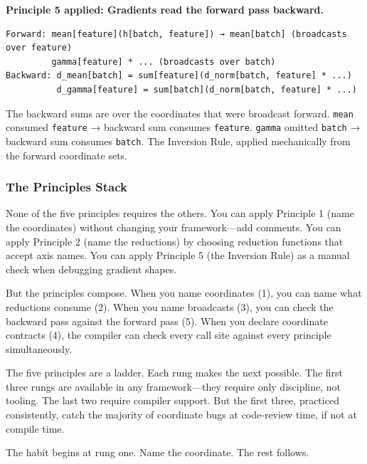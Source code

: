 \documentclass[11pt,titlepage]{article}
\begin{document}
\textbf{Principle 5 applied: Gradients read the forward pass backward.}

\begin{verbatim}
Forward: mean[feature](h[batch, feature]) → mean[batch] (broadcasts over feature)
         gamma[feature] * ... (broadcasts over batch)
Backward: d_mean[batch] = sum[feature](d_norm[batch, feature] * ...)
          d_gamma[feature] = sum[batch](d_norm[batch, feature] * ...)
\end{verbatim}

The backward sums are over the coordinates that were broadcast forward.
\texttt{mean} consumed \texttt{feature} → backward sum consumes
\texttt{feature}. \texttt{gamma} omitted \texttt{batch} → backward sum
consumes \texttt{batch}. The Inversion Rule, applied mechanically from
the forward coordinate sets.

\vspace{2em}

\hypertarget{the-principles-stack}{%
\subsubsection{The Principles Stack}\label{the-principles-stack}}

None of the five principles requires the others. You can apply Principle
1 (name the coordinates) without changing your framework---add comments.
You can apply Principle 2 (name the reductions) by choosing reduction
functions that accept axis names. You can apply Principle 5 (the
Inversion Rule) as a manual check when debugging gradient shapes.

But the principles compose. When you name coordinates (1), you can name
what reductions consume (2). When you name broadcasts (3), you can check
the backward pass against the forward pass (5). When you declare
coordinate contracts (4), the compiler can check every call site against
every principle simultaneously.

The five principles are a ladder. Each rung makes the next possible. The
first three rungs are available in any framework---they require only
discipline, not tooling. The last two require compiler support. But the
first three, practiced consistently, catch the majority of coordinate
bugs at code-review time, if not at compile time.

The habit begins at rung one. Name the coordinate. The rest follows.

\vspace{2em}
\end{document}

